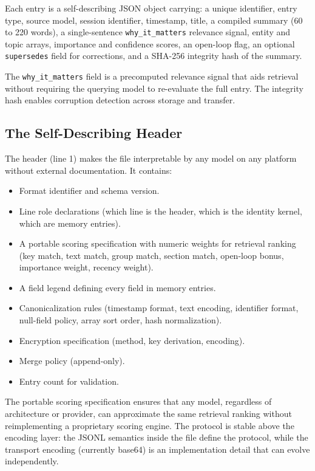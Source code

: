 \documentclass[11pt,a4paper]{article}
\begin{document}
Each entry is a self-describing JSON object carrying: a unique identifier, entry type, source model, session identifier, timestamp, title, a compiled summary (60 to 220 words), a single-sentence \texttt{why\_it\_matters} relevance signal, entity and topic arrays, importance and confidence scores, an open-loop flag, an optional \texttt{supersedes} field for corrections, and a SHA-256 integrity hash of the summary.

The \texttt{why\_it\_matters} field is a precomputed relevance signal that aids retrieval without requiring the querying model to re-evaluate the full entry. The integrity hash enables corruption detection across storage and transfer.

\subsection{The Self-Describing Header}

The header (line 1) makes the file interpretable by any model on any platform without external documentation. It contains:

\begin{itemize}
    \item Format identifier and schema version.
    \item Line role declarations (which line is the header, which is the identity kernel, which are memory entries).
    \item A portable scoring specification with numeric weights for retrieval ranking (key match, text match, group match, section match, open-loop bonus, importance weight, recency weight).
    \item A field legend defining every field in memory entries.
    \item Canonicalization rules (timestamp format, text encoding, identifier format, null-field policy, array sort order, hash normalization).
    \item Encryption specification (method, key derivation, encoding).
    \item Merge policy (append-only).
    \item Entry count for validation.
\end{itemize}

The portable scoring specification ensures that any model, regardless of architecture or provider, can approximate the same retrieval ranking without reimplementing a proprietary scoring engine. The protocol is stable above the encoding layer: the JSONL semantics inside the file define the protocol, while the transport encoding (currently base64) is an implementation detail that can evolve independently.
\end{document}

